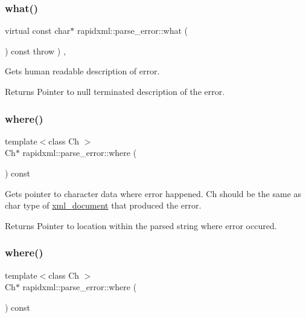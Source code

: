 \subsubsection{\texorpdfstring{what()}{what()}\hspace{0.1cm}{\footnotesize\ttfamily [2/2]}}
{\footnotesize\ttfamily virtual const char$\ast$ rapidxml\+::parse\+\_\+error\+::what (\begin{DoxyParamCaption}{ }\end{DoxyParamCaption}) const throw  ) \hspace{0.3cm}{\ttfamily [inline]}, {\ttfamily [virtual]}}

Gets human readable description of error. \begin{DoxyReturn}{Returns}
Pointer to null terminated description of the error. 
\end{DoxyReturn}
\mbox{\label{classrapidxml_1_1parse__error_ab139528f4d9e960f0ee807d22d6c032d}} 
\subsubsection{\texorpdfstring{where()}{where()}\hspace{0.1cm}{\footnotesize\ttfamily [1/2]}}
{\footnotesize\ttfamily template$<$class Ch $>$ \\
Ch$\ast$ rapidxml\+::parse\+\_\+error\+::where (\begin{DoxyParamCaption}{ }\end{DoxyParamCaption}) const\hspace{0.3cm}{\ttfamily [inline]}}

Gets pointer to character data where error happened. Ch should be the same as char type of \mbox{\hyperlink{classrapidxml_1_1xml__document}{xml\+\_\+document}} that produced the error. \begin{DoxyReturn}{Returns}
Pointer to location within the parsed string where error occured. 
\end{DoxyReturn}
\mbox{\label{classrapidxml_1_1parse__error_ab139528f4d9e960f0ee807d22d6c032d}} 
\subsubsection{\texorpdfstring{where()}{where()}\hspace{0.1cm}{\footnotesize\ttfamily [2/2]}}
{\footnotesize\ttfamily template$<$class Ch $>$ \\
Ch$\ast$ rapidxml\+::parse\+\_\+error\+::where (\begin{DoxyParamCaption}{ }\end{DoxyParamCaption}) const\hspace{0.3cm}{\ttfamily [inline]}}

